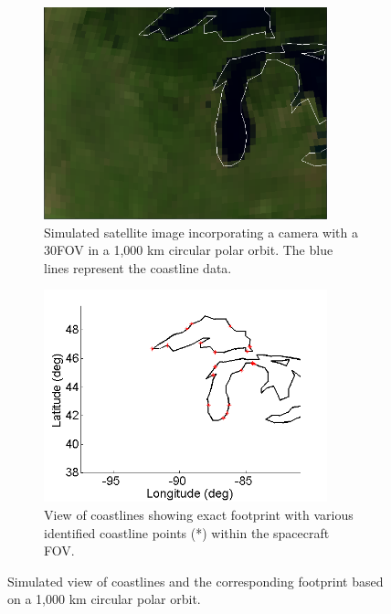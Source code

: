 \documentclass[]{aiaa-tc}%
\begin{document}
\begin{figure}[h!]
\centering
\begin{subfigure}{.48\textwidth}
  \centering
  \includegraphics[width=0.9\textwidth]{Michigan_sat}
  \caption{Simulated satellite image incorporating a camera with a 30\degree FOV in a 1,000 km circular polar orbit.  The blue lines represent the coastline data.}
  \label{fig:satellite}
\end{subfigure}\hfill
\begin{subfigure}{.48\textwidth} 
  \centering
  \includegraphics[width=0.9\textwidth]{Michigan}
  \caption{View of coastlines showing exact footprint with various identified coastline points (*) within the spacecraft FOV.}
  \label{fig:coastline}
\end{subfigure}
\caption{Simulated view of coastlines and the corresponding footprint based on a 1,000 km circular polar orbit.}
\label{fig:matlabstuff}
\end{figure}
\end{document}
